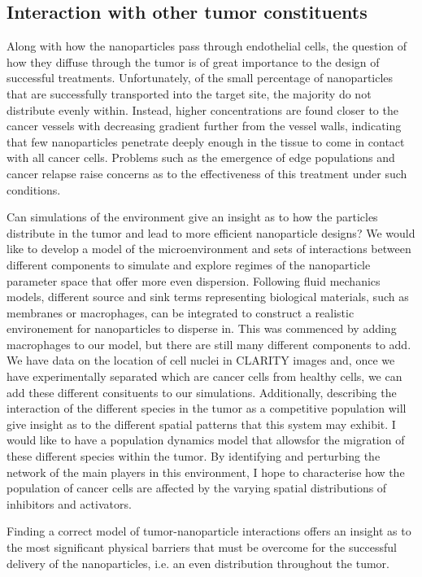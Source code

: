 \subsection{Interaction with other tumor constituents}

Along with how the nanoparticles pass through endothelial cells, the question of how they diffuse through the tumor is of great importance to the design of successful treatments.
Unfortunately, of the small percentage of nanoparticles that are successfully transported into the target site, the majority do not distribute evenly within.
Instead, higher concentrations are found closer to the cancer vessels with decreasing gradient further from the vessel walls, indicating that few nanoparticles penetrate deeply enough in the tissue to come in contact with all cancer cells\cite{Sykes2014}.
Problems such as the emergence of edge populations and cancer relapse raise concerns as to the effectiveness of this treatment under such conditions.

Can simulations of the environment give an insight as to how the particles distribute in the tumor and lead to more efficient nanoparticle designs?
We would like to develop a model of the microenvironment and sets of interactions between different components to simulate and explore regimes of the nanoparticle parameter space that offer more even dispersion.
Following fluid mechanics models, different source and sink terms representing biological materials, such as membranes or macrophages, can be integrated to construct a realistic environement for nanoparticles to disperse in.
This was commenced by adding macrophages to our model, but there are still many different components to add.
We have data on the location of cell nuclei in CLARITY images and, once we have experimentally separated which are cancer cells from healthy cells, we can add these different consituents to our simulations.
Additionally, describing the interaction of the different species in the tumor as a competitive population will give insight as to the different spatial patterns that this system may exhibit.
I would like to have a population dynamics model that allowsfor the migration of these different species within the tumor.
By identifying and perturbing the network of the main players in this environment, I hope to characterise how the population of cancer cells are affected by the varying  spatial distributions of inhibitors and activators.

Finding a correct model of tumor-nanoparticle interactions offers an insight as to the most significant physical barriers that must be overcome for the successful delivery of the nanoparticles, i.e. an even distribution throughout the tumor.


